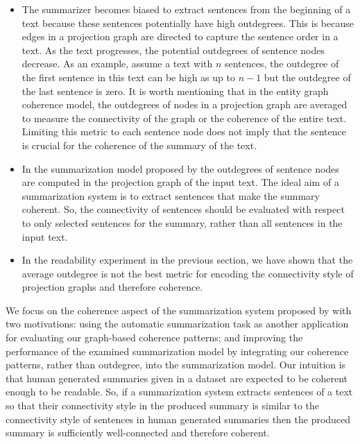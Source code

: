 \begin{itemize}
	\item 
	The summarizer becomes biased to extract sentences from the beginning of a text because these sentences potentially have high outdegrees. 
	This is because edges in a projection graph are directed to capture the sentence order in a text.
	As the text progresses, the potential outdegrees of sentence nodes decrease. 
	As an example, assume a text with $n$ sentences, the outdegree of the first sentence in this text can be high as up to $n-1$ but the outdegree of the last sentence is zero. 
	It is worth mentioning that in the entity graph coherence model, the outdegrees of nodes in a projection graph are averaged to measure the connectivity of the graph or the coherence of the entire text.  
	Limiting this metric to each sentence node does not imply that the sentence is crucial for the coherence of the summary of the text.   
	
	\item 
	In the summarization model proposed by   the outdegrees of sentence nodes are computed in the projection graph of the input text.   
	The ideal aim of a summarization system is to extract sentences that make the summary coherent. 
	So, the connectivity of sentences should be evaluated with respect to only  selected sentences for the summary, rather than all sentences in the input text. 


	\item In the readability experiment in the previous section, we have shown that the average outdegree is not the best metric for encoding the connectivity style of projection graphs and therefore coherence. 
	
\end{itemize} 

We focus on the coherence aspect of the summarization system proposed by  with two motivations: using the automatic summarization task as another application for evaluating our graph-based coherence patterns; and improving the performance of the examined summarization model by integrating our coherence patterns, rather than outdegree, into the summarization model. 
Our intuition is that human generated summaries given in a dataset are expected to be coherent enough to be readable.
So, if a summarization system extracts sentences of a text so that their connectivity style in the produced summary is similar to the connectivity style of sentences in human generated summaries then the produced summary is sufficiently well-connected and therefore coherent. 
 

